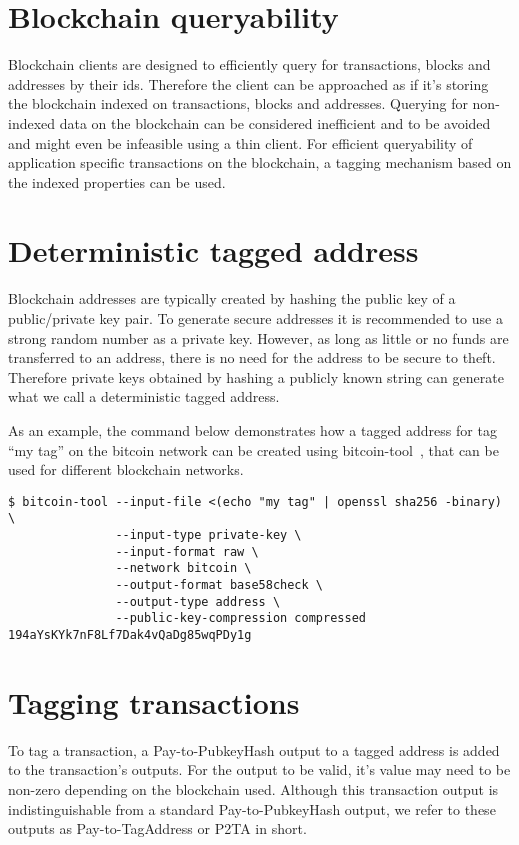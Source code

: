 \documentclass[a4paper,10pt]{article}
\begin{document}
\section{Blockchain queryability}
Blockchain clients are designed to efficiently query for transactions, blocks and addresses by their ids.
Therefore the client can be approached as if it's storing the blockchain indexed on transactions, blocks and addresses.
Querying for non-indexed data on the blockchain can be considered inefficient and to be avoided and might even be infeasible using a thin client.
For efficient queryability of application specific transactions on the blockchain, a tagging mechanism based on the indexed properties can be used.

\section{Deterministic tagged address}
\label{sec:taggedaddress}
Blockchain addresses are typically created by hashing the public key of a public/private key pair.
To generate secure addresses it is recommended to use a strong random number as a private key.
However, as long as little or no funds are transferred to an address, there is no need for the address to be secure to theft.
Therefore private keys obtained by hashing a publicly known string can generate what we call a deterministic tagged address.

As an example, the command below demonstrates how a tagged address for tag ``my tag'' on the bitcoin network can be created using bitcoin-tool~\cite{Matja}, that can be used for different blockchain networks.
\begin{verbatim}
$ bitcoin-tool --input-file <(echo "my tag" | openssl sha256 -binary) \
               --input-type private-key \
               --input-format raw \
               --network bitcoin \
               --output-format base58check \
               --output-type address \
               --public-key-compression compressed
194aYsKYk7nF8Lf7Dak4vQaDg85wqPDy1g
\end{verbatim}

\section{Tagging transactions}
To tag a transaction, a Pay-to-PubkeyHash output to a tagged address is added to the transaction's outputs.
For the output to be valid, it's value may need to be non-zero depending on the blockchain used.
Although this transaction output is indistinguishable from a standard Pay-to-PubkeyHash output, we refer to these outputs as Pay-to-TagAddress or P2TA in short.
\end{document}
